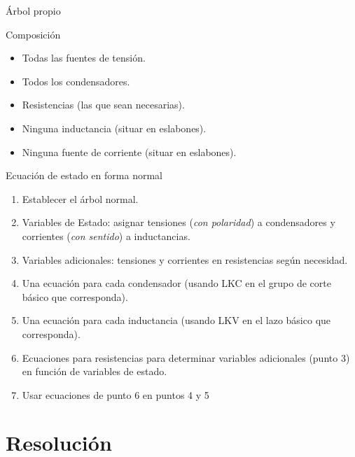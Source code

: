 \documentclass[xcolor={usenames,svgnames,dvipsnames}]{beamer}
\begin{document}
\begin{frame}[label={sec:org7bab74f}]{Árbol propio}
\begin{block}{Composición}
\begin{itemize}
\item Todas las fuentes de tensión.
\item Todos los condensadores.
\item Resistencias (las que sean necesarias).
\item Ninguna inductancia (situar en eslabones).
\item Ninguna fuente de corriente (situar en eslabones).
\end{itemize}
\end{block}
\end{frame}

\begin{frame}[label={sec:org911da04}]{Ecuación de estado en forma normal}
\begin{enumerate}
\item Establecer el \alert{árbol normal}.\pause
\item \alert{Variables de Estado}: asignar tensiones (\emph{con polaridad}) a condensadores y corrientes (\emph{con sentido}) a inductancias.\pause
\item \alert{Variables adicionales}: tensiones y corrientes en resistencias según necesidad.\pause
\item Una \alert{ecuación para cada condensador} (usando LKC en el grupo de corte básico que corresponda).\pause
\item Una \alert{ecuación para cada inductancia} (usando LKV en el lazo básico que corresponda).\pause
\item \alert{Ecuaciones para resistencias} para determinar variables adicionales (punto 3) en función de variables de estado.\pause

\item Usar ecuaciones de punto 6 en puntos 4 y 5
\end{enumerate}
\end{frame}

\section{Resolución}
\label{sec:org00ca7b6}
\end{document}
